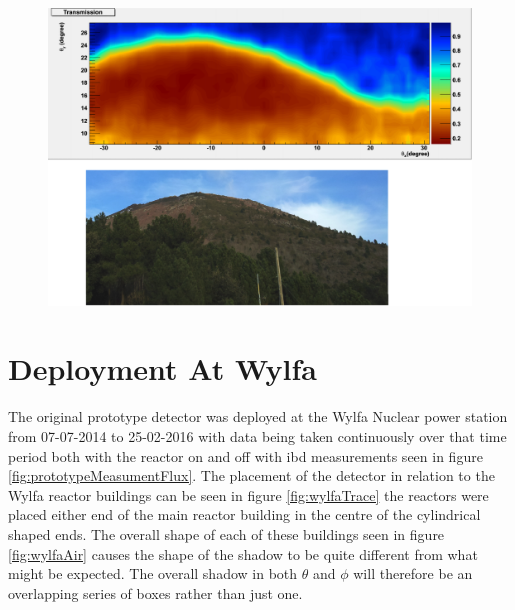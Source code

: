 \begin{figure}[htbp]
 \centering
 \includegraphics[width=1.0\linewidth]{Chapter5/Figs/Raster/mtVesuviusMuRayTransmission.png}
 \label{fig:mtVesuviusMuRayTransmission}
\end{figure}

\section{Deployment At Wylfa}\label{sec:deploymentAtWylfa}
The original prototype detector was deployed at the Wylfa Nuclear power station from 07-07-2014 to 25-02-2016 with data being taken continuously over that time period both with the reactor on and off with ibd measurements seen in figure \ref{fig:prototypeMeasumentFlux}. The placement of the detector in relation to the Wylfa reactor buildings can be seen in figure \ref{fig:wylfaTrace} the reactors were placed either end of the main reactor building in the centre of the cylindrical shaped ends. The overall shape of each of these buildings seen in figure \ref{fig:wylfaAir} causes the shape of the shadow to be quite different from what might be expected. The overall shadow in both $\theta$ and $\phi$ will therefore be an overlapping series of boxes rather than just one.   

